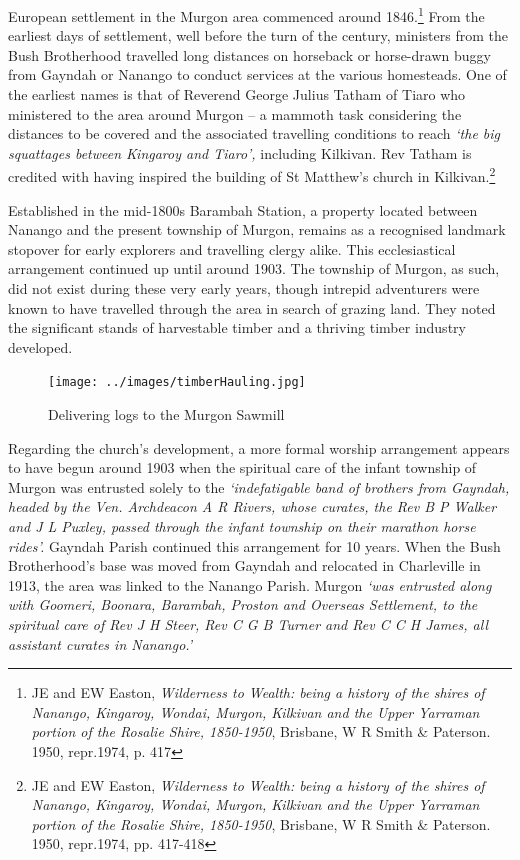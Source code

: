 European settlement in the Murgon area commenced around 1846.\footnote{JE and EW Easton, \emph{Wilderness to Wealth: being a history of the shires of Nanango, Kingaroy, Wondai, Murgon, Kilkivan and the Upper Yarraman portion of the Rosalie Shire, 1850-1950}, Brisbane, W R Smith \& Paterson. 1950, repr.1974, p. 417} From the earliest days of settlement, well before the turn of the century, ministers from the Bush Brotherhood travelled long distances on horseback or horse-drawn buggy from Gayndah or Nanango to conduct services at the various homesteads. One of the earliest names is that of Reverend George Julius Tatham of Tiaro who ministered to the area around Murgon -- a mammoth task considering the distances to be covered and the associated travelling conditions to reach \emph{`the big squattages between Kingaroy and Tiaro',} including Kilkivan. Rev Tatham is credited with having inspired the building of St Matthew's church in Kilkivan.\footnote{JE and EW Easton, \emph{Wilderness to Wealth: being a history of the shires of Nanango, Kingaroy, Wondai, Murgon, Kilkivan and the Upper Yarraman portion of the Rosalie Shire, 1850-1950}, Brisbane, W R Smith \& Paterson. 1950, repr.1974, pp. 417-418}


Established in the mid-1800s Barambah Station, a property located between Nanango and the present township of Murgon, remains as a recognised landmark stopover for early explorers and travelling clergy alike. This ecclesiastical arrangement continued up until around 1903. The township of Murgon, as such, did not exist during these very early years, though intrepid adventurers were known to have travelled through the area in search of grazing land. They noted the significant stands of harvestable timber and a thriving timber industry developed.









\begin{figure}
\begin{center}
\texttt{[image: ../images/timberHauling.jpg]}
\caption{Delivering logs to the Murgon Sawmill}
\end{center}
\end{figure}




Regarding the church's development, a more formal worship arrangement appears to have begun around 1903 when the spiritual care of the infant township of Murgon was entrusted solely to the \emph{`indefatigable band of brothers from Gayndah, headed by the Ven. Archdeacon A R Rivers, whose curates, the Rev B P Walker and J L Puxley, passed through the infant township on their marathon horse rides'.} Gayndah Parish continued this arrangement for 10 years. When the Bush Brotherhood's base was moved from Gayndah and relocated in Charleville in 1913, the area was linked to the Nanango Parish. Murgon \emph{`was entrusted along with Goomeri, Boonara, Barambah, Proston and Overseas Settlement, to the spiritual care of Rev J H Steer, Rev C G B Turner and Rev C C H James, all assistant curates in Nanango.'}



